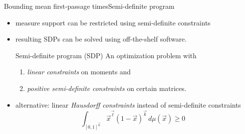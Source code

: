 \documentclass[9pt]{beamer}
\newcommand{\bottomcite}[1]{\vspace*{\fill} {\scriptsize \parencite{#1}}}
\begin{document}
\begin{frame}{Bounding mean first-passage times}{Semi-definite program}
  \begin{itemize}
    \item measure support can be restricted using semi-definite constraints
    \item resulting SDPs can be solved using off-the-shelf software.
    \begin{block}{Semi-definite program (SDP)}
        An optimization problem with
        \begin{enumerate}
            \item \emph{linear constraints} on moments and
            \item \emph{positive semi-definite constraints} on certain matrices.
        \end{enumerate}
    \end{block}
    \item alternative: linear \emph{Hausdorff constraints} instead of semi-definite constraints
        \[\int_{[0,1]^{\vec n}}{\vec x}^{\vec\ell}{(1-\vec x)}^{\vec k}\,d\mu(\vec x)\geq 0\]
  \end{itemize}
\bottomcite{backenkohler2019bounding}
\end{frame}
\end{document}
